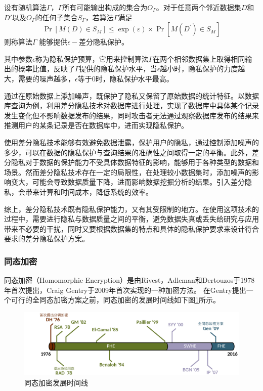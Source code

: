 \begin{definition}
	设有随机算法$ \varGamma $，$ \varGamma $所有可能输出构成的集合为$ O_{\varGamma} $。对于任意两个邻近数据集$ D $和$ D' $以及$ O_{\varGamma} $的任何子集合$ S_{\varGamma} $，若算法$ \varGamma $满足
	\begin{equation}
		\operatorname{Pr}\left[M(D) \in S_M\right] \leq \exp (\varepsilon) \times \operatorname{Pr}\left[M\left(D^{\prime}\right) \in S_M\right]
	\end{equation}
	则称算法$ \varGamma $ 能够提供$ \epsilon -$差分隐私保护。
\end{definition}

其中参数$ \epsilon $称为隐私保护预算，它用来控制算法$ \varGamma $在两个相邻数据集上取得相同输出的概率比值，反映了$ \varGamma $提供的隐私保护水平，当$ \epsilon $越小时，隐私保护的力度越大，需要的噪声越多，$ \epsilon $等于0时，隐私保护水平最高。

通过在原始数据上添加噪声，既保护了隐私又保留了原始数据的统计特征。以数据库查询为例，利用差分隐私技术对数据库进行处理，实现了数据库中具体某个记录发生变化但不影响数据发布的结果，同时攻击者无法通过观察数据库发布的结果来推测用户的某条记录是否在数据库中，进而实现隐私保护。

使用差分隐私技术能够有效避免数据泄露，保护用户的隐私，通过控制添加噪声的多少，可以在数据的隐私保护与查询结果的准确性之间取得一定的平衡。此外，差分隐私对于数据的保护能力不受具体数据特征的影响，能够用于各种类型的数据和场景。然而差分隐私技术存在一定的局限性，在处理较小数据集时，添加噪声的影响变大，可能会导致数据质量下降，进而影响数据挖掘分析的结果。引入差分隐私，会带来计算和时间成本，降低系统的效率。

综上，差分隐私技术既有隐私保护能力，又有其受限制的地方。在使用这项技术的过程中，需要进行隐私与数据质量之间的平衡，避免数据失真或丢失给研究与应用带来不必要的干扰，同时又要根据数据集的特点和具体的隐私保护要求来设计符合要求的差分隐私保护方案。

\subsubsection{同态加密}
同态加密（Homomorphic Encryption）是由Rivest，Adleman和Dertouzos\cite{rivest1978data}于1978年首次提出，Craig Gentry\cite{gentry2009fully}于2009年首次实现的一种加密方法。
在Gentry提出一个可行的全同态加密方案之前，同态加密的发展时间线\cite{acar2018survey}如下图\ref{timeline}所示。

\begin{figure}[htbp]
	\centering
	\includegraphics[scale=0.17]{img/timeline.png}
	\caption{同态加密发展时间线}
	\label{timeline}
\end{figure}

